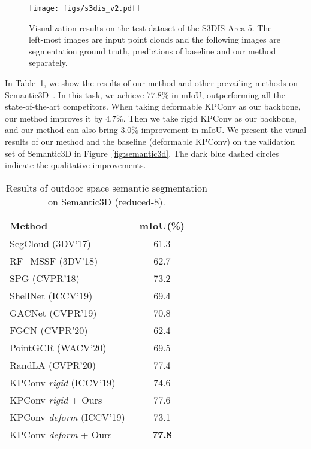 \documentclass[final]{cvpr}
\begin{document}
\begin{figure}[ht]
    \centering
    \texttt{[image: figs/s3dis\_v2.pdf]}
    \caption{Visualization results on the test dataset of the S3DIS Area-5. The left-most images are input point clouds and the following images are segmentation ground truth, predictions of baseline and our method separately.}
    \label{fig:s3dis}
\end{figure}

In Table~\ref{tab:semantic3d}, we show the results of our method and other prevailing methods on Semantic3D~\cite{hackel2017semantic3d}. In this task, we achieve $77.8\%$ in mIoU, outperforming all the state-of-the-art competitors. When taking deformable KPConv as our backbone, our method improves it by $4.7\%$. Then we take rigid KPConv as our backbone, and our method can also bring $3.0\%$ improvement in mIoU. We present the visual results of our method and the baseline (deformable KPConv) on the validation set of Semantic3D in Figure~\ref{fig:semantic3d}. The dark blue dashed circles indicate the qualitative improvements.

\begin{table}
\centering
\begin{tabular}{lccc}  
\toprule
Method  & mIoU(\%) \\
\midrule
SegCloud ({\color{blue}3DV'17})~\cite{tchapmi2017segcloud} & 61.3\\
RF\_MSSF ({\color{blue}3DV'18})~\cite{thomas2018semantic} & 62.7\\
SPG ({\color{blue}CVPR'18})~\cite{landrieu2018large} & 73.2\\
ShellNet ({\color{blue}ICCV'19})~\cite{zhang2019shellnet} & 69.4\\
GACNet ({\color{blue}CVPR'19})~\cite{wang2019graph} & 70.8\\
FGCN ({\color{blue}CVPR'20})~\cite{khan2020fgcn} & 62.4\\
PointGCR ({\color{blue}WACV'20})~\cite{ma2020global} & 69.5\\
RandLA ({\color{blue}CVPR'20})~\cite{hu2020randla} & 77.4\\
\midrule
KPConv \textit{rigid} ({\color{blue}ICCV'19})~\cite{thomas2019kpconv} & 74.6\\
KPConv \textit{rigid} + Ours & 77.6\\
\midrule
KPConv \textit{deform} ({\color{blue}ICCV'19})~\cite{thomas2019kpconv} & 73.1\\
KPConv \textit{deform} + Ours & \textbf{77.8}\\
\bottomrule
\end{tabular}
\caption{Results of outdoor space semantic segmentation on Semantic3D (reduced-8).}
\label{tab:semantic3d}
\end{table}
\end{document}
